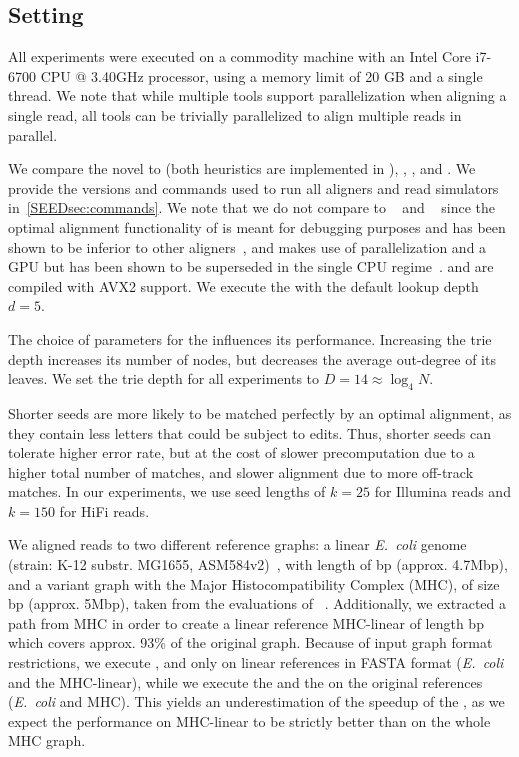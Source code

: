 \subsection{Setting}
%
All experiments were executed on a commodity machine with an Intel Core i7-6700
CPU @ 3.40GHz processor, using a memory limit of 20 GB and a single thread.
%
We note that while multiple tools support parallelization when aligning a single
read, all tools can be trivially parallelized to align multiple reads in
parallel.

%
We compare the novel \seedh to \prefixh (both heuristics are implemented in
\astarix), \graphaligner, \pasgal, and \vargas. We provide the versions and
commands used to run all aligners and read simulators in~\cref{SEEDsec:commands}. 
%
We note that we do not compare to \vg~\citep{garrison_variation_2018} and
\hga~\citep{feng2021accelerating} since the optimal alignment functionality of
\vg is meant for debugging purposes and has been shown to be inferior to other
aligners~\citep[Tab.~4]{feng2021accelerating}, and \hga makes use of
parallelization and a GPU but has been shown to be superseded in the single CPU
regime~\citep[Fig.~9]{feng2021accelerating}. \pasgal and \vargas are compiled
with AVX2 support. We execute the \prefixh with the default lookup depth $d=5$.

%
The choice of parameters for the \seedh influences its performance.
%
Increasing the trie depth increases its number of nodes, but decreases the
average out-degree of its leaves. We set the trie depth for all experiments to
$D=14 \approx \log_4 N$.

Shorter seeds are more likely to be matched perfectly by an optimal alignment,
as they contain less letters that could be subject to edits. Thus, shorter seeds
can tolerate higher error rate, but at the cost of slower precomputation due to
a higher total number of matches, and slower alignment due to more off-track
matches.
%
In our experiments, we use seed lengths of $k=25$ for Illumina reads and $k=150$
for HiFi reads.

%
We aligned reads to two different reference graphs: a linear \textit{E.~coli}
genome (strain: K-12 substr. MG1655, ASM584v2)~\citep{howe2019ensembl}, with
length of bp (approx. 4.7Mbp), and a variant graph with the
Major Histocompatibility Complex (MHC), of size bp (approx.
5Mbp), taken from the evaluations of \pasgal~\citep{jain_accelerating_2019}.
%
Additionally, we extracted a path from MHC in order to create a linear reference
MHC-linear of length bp which covers approx. 93\% of the
original graph. Because of input graph format restrictions, we execute
\graphaligner, \vargas and \pasgal only on linear references in FASTA format
(\textit{E.~coli} and the MHC-linear), while we execute the \seedh and the
\prefixh on the original references (\textit{E.~coli} and MHC). This yields an
underestimation of the speedup of the \seedh, as we expect the performance on
MHC-linear to be strictly better than on the whole MHC graph.

